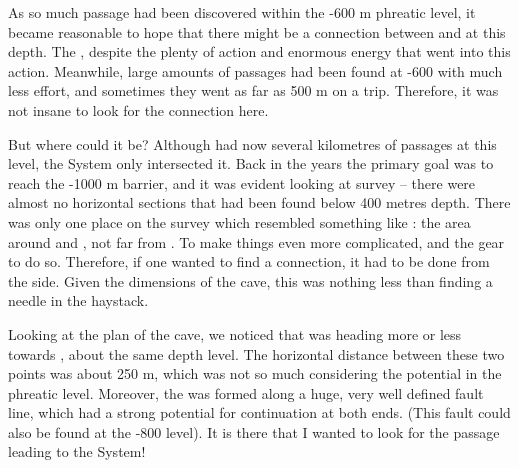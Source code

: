 As so much passage had been discovered within the -600 m phreatic level,
it became reasonable to hope that there might be a connection between
 and  at this depth. The
,
despite the plenty of action and enormous energy that went into this
action. Meanwhile, large amounts of passages had been found at -600 with
much less effort, and sometimes they went as far as 500 m on a trip.
Therefore, it was not insane to look for the connection here.

But where could it be? Although  had now several
kilometres of passages at this level, the System only intersected it.
Back in the years the primary goal was to reach the -1000 m barrier, and
it was evident looking at survey -- there were almost no horizontal
sections that had been found below 400 metres depth. There was only one
place on the survey which resembled something like : the area around  and , not far
from . To make things even more complicated,  and the gear to do so. Therefore, if one wanted to find a
connection, it had to be done from the  side. Given the
dimensions of the cave, this was nothing less than finding a needle in
the haystack.

Looking at the plan of the cave, we noticed that 
was heading more or less towards , about the same depth
level. The horizontal distance between these two points was about 250 m,
which was not so much considering the potential in the phreatic level.
Moreover, the  was formed along a huge, very well
defined fault line, which had a strong potential for continuation at
both ends. (This fault could also be found at the -800 level). It is
there that I wanted to look for the passage leading to the System!


